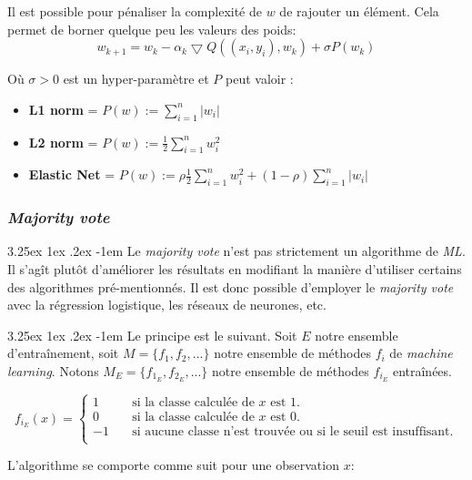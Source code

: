 \documentclass[a4paper, 11pt]{article}
\makeatletter
\renewcommand\paragraph{\@startsection{paragraph}{5}{\z@}%
  {3.25ex \@plus1ex \@minus.2ex}%
  {-1em}%
  {\normalfont\normalsize\bfseries}}
\makeatother
\begin{document}
Il est possible pour pénaliser la complexité de $w$ de rajouter un élément. Cela permet de borner quelque peu les valeurs des poids:
$$w_{k+1} = w_k -\alpha_k \bigtriangledown Q ((x_i,y_i), w_k) + \sigma P(w_k)$$

Où $\sigma > 0$ est un hyper-paramètre et $P$ peut valoir :
\begin{itemize}
\item \textbf{L1 norm} = $P(w) := \sum\limits_{i=1}^n |w_i|$
\item \textbf{L2 norm} = $P(w) := \frac{1}{2}\sum\limits_{i=1}^n w_i^2$
\item \textbf{Elastic Net} = $P(w) := \rho \frac{1}{2}\sum\limits_{i=1}^n w_i^2 + (1 - \rho) \sum\limits_{i=1}^n |w_i|$
\end{itemize}


\subsubsection{\textit{Majority vote}} \label{section majority vote}
\paragraph{}
Le \textit{majority vote} n'est pas strictement un algorithme de \textit{ML}. Il s'agît plutôt d'améliorer les résultats en modifiant la manière d'utiliser certains des algorithmes pré-mentionnés.
Il est donc possible d'employer le \textit{majority vote} avec la régression logistique, les réseaux de neurones, etc.

\paragraph{}
Le principe est le suivant. Soit $E$ notre ensemble d'entraînement, soit $M = \{f_1, f_2, ...\}$ notre ensemble de méthodes $f_i$ de \textit{machine learning}. Notons $M_E = \{f_{1_E}, f_{2_E}, ...\}$ notre ensemble de méthodes $f_{i_E}$ entraînées.
 
\[ f_{i_E}(x) =
  \begin{cases}
    1       & \quad \text{si la classe calculée de $x$ est 1.}\\
    0  & \quad \text{si la classe calculée de $x$ est 0.}\\
    -1 & \quad \text{si aucune classe n'est trouvée ou si le seuil est insuffisant.}\\
  \end{cases}
\]

L'algorithme se comporte comme suit pour une observation $x$:
\end{document}
